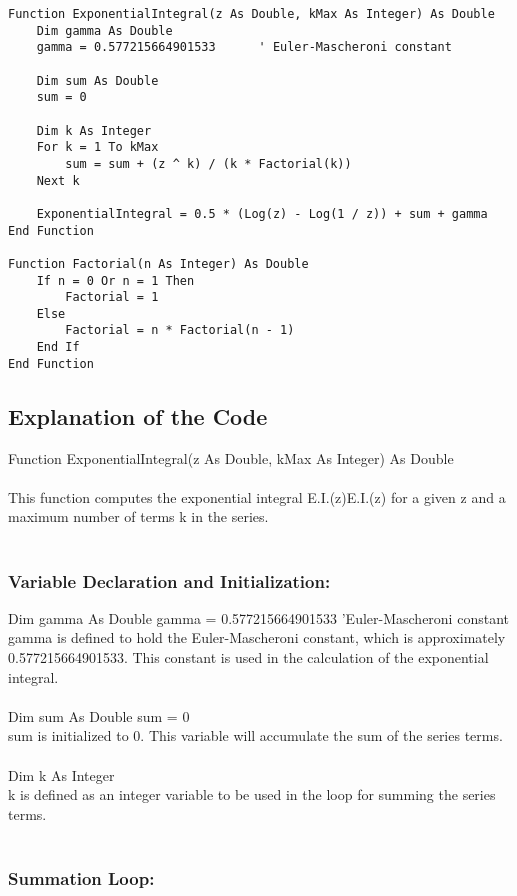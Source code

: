 \documentclass{article}
\begin{document}
\begin {verbatim}
Function ExponentialIntegral(z As Double, kMax As Integer) As Double
    Dim gamma As Double
    gamma = 0.577215664901533      ' Euler-Mascheroni constant
    
    Dim sum As Double
    sum = 0
    
    Dim k As Integer
    For k = 1 To kMax
        sum = sum + (z ^ k) / (k * Factorial(k))
    Next k
    
    ExponentialIntegral = 0.5 * (Log(z) - Log(1 / z)) + sum + gamma
End Function

Function Factorial(n As Integer) As Double
    If n = 0 Or n = 1 Then
        Factorial = 1
    Else
        Factorial = n * Factorial(n - 1)
    End If
End Function
\end{verbatim}
\subsection{Explanation of the Code}
Function ExponentialIntegral(z As Double, kMax As Integer) As Double\\
\\
This function computes the exponential integral E.I.(z)E.I.(z) for a given z and a maximum number of terms k in the series.
\\
\\ \subsubsection{Variable Declaration and Initialization:}
Dim gamma As Double
gamma = 0.577215664901533           'Euler-Mascheroni constant\\
gamma is defined to hold the Euler-Mascheroni constant, which is approximately 0.577215664901533. This constant is used in the calculation of the exponential integral.
\\
\\Dim sum As Double
sum = 0
\\sum is initialized to 0. This variable will accumulate the sum of the series terms.\\
\\
Dim k As Integer\\
k is defined as an integer variable to be used in the loop for summing the series terms.\\
\\ \subsubsection{Summation Loop:}
\end{document}
